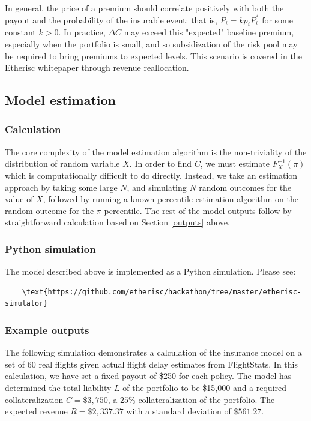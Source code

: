 \documentclass[12pt]{article}
\begin{document}
In general, the price of a premium should correlate positively with both the payout and the probability of the insurable event: that is, $P_i = kp_iP_i^*$ for some constant $k>0$. In practice, $\Delta C$ may exceed this "expected" baseline premium, especially when the portfolio is small, and so subsidization of the risk pool may be required to bring premiums to expected levels. This scenario is covered in the Etherisc whitepaper through revenue reallocation.

\subsection{Model estimation}

\subsubsection{Calculation}

The core complexity of the model estimation algorithm is the non-triviality of the distribution of random variable $X$. In order to find $C$, we must estimate $F_X^{-1}(\pi)$ which is computationally difficult to do directly. Instead, we take an estimation approach by taking some large $N$, and simulating $N$ random outcomes for the value of $X$, followed by running a known percentile estimation algorithm on the random outcome for the $\pi$-percentile. The rest of the model outputs follow by straightforward calculation based on Section \ref{outputs} above.

\subsubsection{Python simulation}

The model described above is implemented as a Python simulation. Please see:\\

\begin{verbatim}
    \text{https://github.com/etherisc/hackathon/tree/master/etherisc-simulator}
\end{verbatim}

\subsubsection{Example outputs}

The following simulation demonstrates a calculation of the insurance model on a set of 60 real flights given actual flight delay estimates from FlightStats. In this calculation, we have set a fixed payout of \$250 for each policy. The model has determined the total liability $L$ of the portfolio to be \$15,000 and a required collateralization $C=\$3,750$, a $25\%$ collateralization of the portfolio. The expected revenue $R=\$2,337.37$ with a standard deviation of $\$561.27$.
\end{document}
